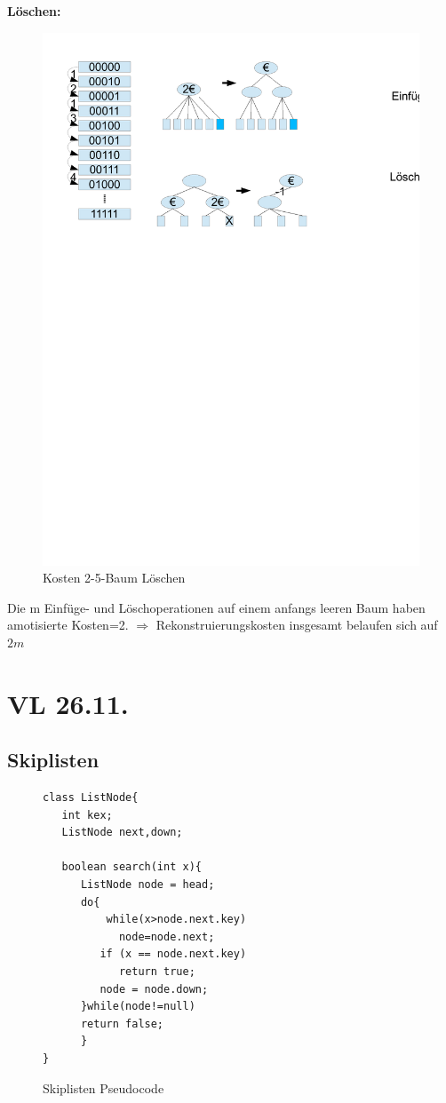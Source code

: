 \documentclass[a4paper,twoside,10pt]{report}
\begin{document}
\textbf{Löschen:}
\begin{figure}[H]\center
\includegraphics[trim=  6cm 18.5cm 6cm 7cm,clip,width=\columnwidth]{figures/zaehler.pdf}
\caption{Kosten 2-5-Baum Löschen}
\end{figure}

Die m Einfüge- und Löschoperationen auf einem anfangs leeren Baum haben amotisierte Kosten=2.
$\Rightarrow$ Rekonstruierungskosten insgesamt belaufen sich auf $2m$

\section{VL 26.11.}
\subsection{Skiplisten}
\begin{figure}[H]
\begin{verbatim}
class ListNode{
   int kex;
   ListNode next,down;

   boolean search(int x){
      ListNode node = head;
      do{
          while(x>node.next.key)
            node=node.next;
         if (x == node.next.key)
            return true;
         node = node.down; 
      }while(node!=null)
      return false;
      }
}
\end{verbatim}
\caption{Skiplisten Pseudocode}
\end{figure}
\end{document}
